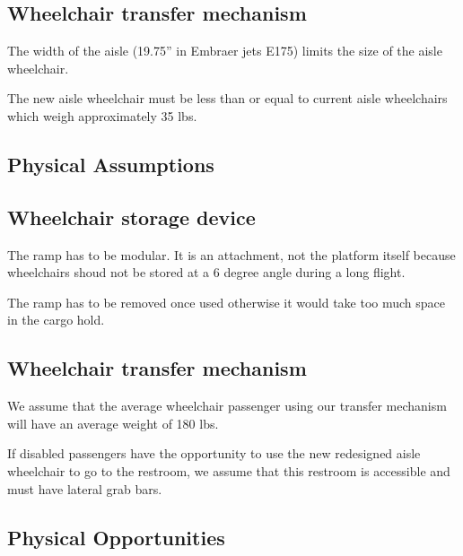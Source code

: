 \subsection*{Wheelchair transfer mechanism}

\begin{list}{-}{}
  \item The width of the aisle (19.75'' in Embraer jets E175) limits the size of the aisle wheelchair.
  \item The new aisle wheelchair must be less than or equal to current aisle wheelchairs which weigh approximately 35 lbs.
\end{list}

\subsection{Physical Assumptions}

\subsection*{Wheelchair storage device}

\begin{list}{-}{}
  \item The ramp has to be modular. It is an attachment, not the platform itself because wheelchairs shoud not be stored at a 6 degree angle during a long flight. 
  \item The ramp has to be removed once used otherwise it would take too much space in the cargo hold.
\end{list}

\subsection*{Wheelchair transfer mechanism}

\begin{list}{-}{}
  \item We assume that the average wheelchair passenger using our transfer mechanism will have an average weight of 180 lbs.
  \item If disabled passengers have the opportunity to use the new redesigned aisle wheelchair to go to the restroom, we assume that this restroom is accessible and must have lateral grab bars.
\end{list}

\newpage

\subsection{Physical Opportunities}

